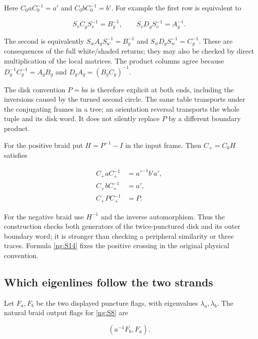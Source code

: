 Here \(C_0aC_0^{-1}=a'\) and \(C_0bC_0^{-1}=b'\).
For example the first row is equivalent to

\begin{equation}\label{ng:S14c}
S_v C_g S_v^{-1}=B_g^{-1},\qquad
 S_v D_g S_v^{-1}=A_g^{-1}.
\end{equation}

The second is equivalently
\(S_w A_gS_w^{-1}=B_g^{-1}\) and
\(S_w D_gS_w^{-1}=C_g^{-1}\).
These are consequences of the full white/shaded returns;
they may also be checked by direct multiplication of the local
matrices. The product columns agree because
\(D_g^{-1}C_g^{-1}=A_gB_g\) and
\(D_gA_g=(B_gC_g)^{-1}\).

The disk convention \(P=ba\) is therefore explicit at both
ends, including the inversions caused by the turned second
circle. The same table transports under the conjugating
frames in a tree; an orientation reversal transports the whole
tuple and its disk word. It does not silently replace \(P\)
by a different boundary product.

For the positive braid put \(H=P^{-1}-I\) in the input
frame. Then \(C_+=C_0H\) satisfies

\begin{equation}\label{ng:S14d}
\begin{aligned}
 C_+aC_+^{-1}&=a'^{-1}b'a',\\
 C_+bC_+^{-1}&=a',\\
 C_+PC_+^{-1}&=P .
\end{aligned}
\end{equation}

For the negative braid use \(H^{-1}\) and the inverse
automorphism. Thus the construction checks both generators of
the twice-punctured disk and its outer boundary word;
it is stronger than checking a peripheral similarity or three
traces. Formula \eqref{ng:S14} fixes the positive crossing in the
original physical convention.

\subsection{Which eigenlines follow the two strands}\label{ng:the-opposite-eigenflag-qualification}

Let \(F_a,F_b\) be the two displayed puncture flags, with
eigenvalues \(\lambda_a,\lambda_b\). The natural braid output
flags for \eqref{ng:S8} are

\begin{equation}\label{ng:S15}
(a^{-1}F_b,F_a).
\end{equation}

